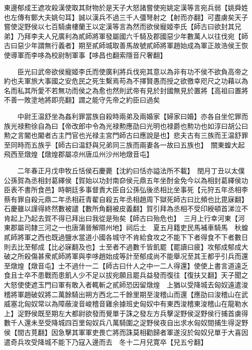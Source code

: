 東邊郁成王遮攻殺漢使取其財物於是天子大怒諸嘗使宛姚定漢等言宛兵弱【姚舜姓也左傳有鄭大夫姚句耳】誠以漢兵不過三千人彊弩射之【射而亦翻】可盡虜矣天子嘗使浞野侯以七百騎虜樓蘭王以定漢等言為然而欲侯寵姬李氏【師古曰欲封其兄弟】乃拜李夫人兄廣利為貳師將軍發屬國六千騎及郡國惡少年數萬人以往伐宛【師古曰惡少年謂無行義者】期至貳師城取善馬故號貳師將軍趙始成為軍正故浩侯王恢使導軍而李哆為校尉制軍事【哆昌也翻索隱音尺奢翻】

　　臣光曰武帝欲侯寵姬李氏而使廣利將兵伐宛其意以為非有功不侯不欲負高帝之約也夫軍旅大事國之安危民之死生繫焉苟為不擇賢愚而授之欲徼幸咫尺之功藉以為名而私其所愛不若無功而侯之為愈也然則武帝有見於封國無見於置將【高祖曰置將不善一敗塗地將即亮翻】謂之能守先帝之約臣曰過矣

　　中尉王温舒坐為姦利罪當族自殺時兩弟及兩婚家【婦家曰婚】亦各自坐佗罪而族光禄勲徐自為曰【帝改郎中令為光禄勲應劭曰光明也禄爵也勲功也如淳曰胡公曰勲之言閽也閽者古主門官也光禄主宮門師古曰應說是也】悲夫古有三族而王温舒罪至同時而五族乎【師古曰温舒與兄弟同三族而兩妻各一故曰五族也】　關東蝗大起飛西至燉煌【燉煌郡屬凉州唐瓜州沙州地燉音屯】

　　二年春正月戊申牧丘恬侯石慶薨【沈約曰恬亦謚法所不載】　閏月丁丑以太僕公孫賀為丞相封葛繹侯【賀始以功封南奅侯元鼎五年坐酎金免今以為相封葛繹侯功臣表不書所食邑】時朝廷多事督責大臣自公孫弘後丞相比坐事死【元狩五年丞相李蔡有罪自殺元鼎二年丞相莊青翟自殺五年丞相趙周下獄死師古曰比頻也比毘寐翻】石慶雖以謹得終然數被譴【數所角翻被皮義翻】賀引拜為丞相不受印綬頓首涕泣不肯起上乃起去賀不得已拜出曰我從是殆矣【師古曰殆危也】　三月上行幸河東【河東郡屬司隸三河之一也唐蒲晉解隰州地】祠后土　夏五月籍吏民馬補車騎馬　秋蝗　貳師將軍之西也既過鹽水當道小國各城守不肯給食攻之不能下下者得食不下者數日則去比至郁成【比必寐翻及也】士至者不過數千皆飢罷【罷讀曰疲】攻郁成郁成大破之所殺傷甚衆貳師將軍與李哆趙始成等計至郁成尚不能舉况至其王都乎引兵而還至燉煌【燉音屯】士不過什一二【師古曰什人之中一二人得還】使使上書言道遠乏食且士卒不患戰而患飢人少不足以拔宛願且罷兵益發而復往【復扶又翻】天子聞之大怒使使遮玉門曰軍有敢入者輒斬之貳師恐因留燉煌　上猶以受降城去匈奴遠遣浚稽將軍趙破奴將二萬餘騎出朔方西北二千餘里期至浚稽山而還【應劭曰浚稽山在武威塞北匈奴常以為障蔽浚音峻稽音雞余據班史匈奴中有東西浚稽東浚稽山在龍勒水上】浞野侯既至期左大都尉欲發而覺單于誅之發左方兵擊浞野侯浞野侯行捕首虜得數千人還未至受降城四百里匈奴兵八萬騎圍之浞野侯夜自出求水匈奴間捕生得浞野侯【間古莧翻】因急擊其軍軍吏畏亡將而誅莫相勸歸者軍遂沒於匈奴兒單于大喜因遣奇兵攻受降城不能下乃寇入邊而去　冬十二月兒寛卒【兒五兮翻】

